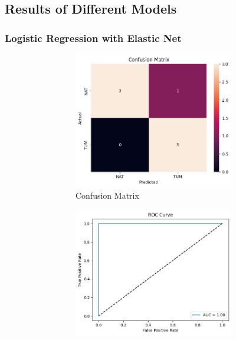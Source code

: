 \documentclass[a4paper,12pt]{article}
\begin{document}
\subsection{Results of Different Models}

\subsubsection{Logistic Regression with Elastic Net}
\begin{figure}[H]
	\centering

	\begin{subfigure}[b]{0.45\textwidth}
		\centering
		\begin{subfigure}[b]{0.49\textwidth}
			\centering
			\includegraphics[width=\textwidth]{images/2lpc.png}  %
			\caption{Confusion Matrix}
			\label{fig:fig1}
		\end{subfigure}
		\hfill
		\begin{subfigure}[b]{0.49\textwidth}
			\centering
			\includegraphics[width=\textwidth]{images/2lpr.png}  %

\end{subfigure}
\end{subfigure}
\end{figure}
\end{document}
